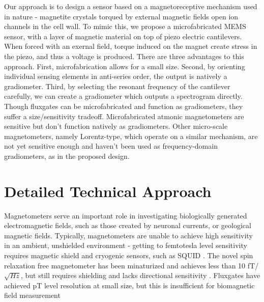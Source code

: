 Our approach is to design a sensor based on a magnetoreceptive mechanism used in nature - magnetite crystals torqued by external magnetic fields open ion channels in the cell wall. To mimic this, we propose a microfabricated MEMS sensor, with a layer of magnetic material on top of piezo electric cantilevers. When forced with an exernal field, torque induced on the magnet create stress in the piezo, and thus a voltage is produced. There are three advantages to this approach. First, microfabrication allows for a small size. Second, by orienting individual sensing elements in anti-series order, the output is natively a gradiometer. Third, by selecting the resonant frequency of the cantilever carefully, we can create a gradiometer which outputs a spectrogram directly. Though fluxgates can be microfabricated and function as gradiometers, they suffer a size/sensitivity tradeoff. Microfabricated atmonic magnetometers are sensitive but don't function natively as gradiometers. Other micro-scale magnetometers, namely Lorentz-type, which operate on a similar mechanism, are not yet sensitive enough and haven't been used as frequency-domain gradiometers, as in the proposed design.

\section{Detailed Technical Approach}

Magnetometers serve an important role in investigating biologically generated electromagnetic fields, such as those created by neuronal currents, or geological magnetic fields. Typically, magnetometers are unable to achieve high sensitivity in an ambient, unshielded environment - getting to femtotesla level sensitivity requires magnetic shield and cryogenic sensors, such as SQUID \cite{lenz2006magnetic}. The novel spin relaxation free magnetometer has been minaturized and achieves less than 10 fT/$\sqrt{Hz}$, but still requires shielding and lacks directional sensitivity \cite{shah2013compact}. Fluxgates have achieved pT level resolution at small size, but this is insufficient for biomagnetic field measurement \cite{sasada2002orthogonal,uchiyama2014highly,sasada2014fundamental} 


